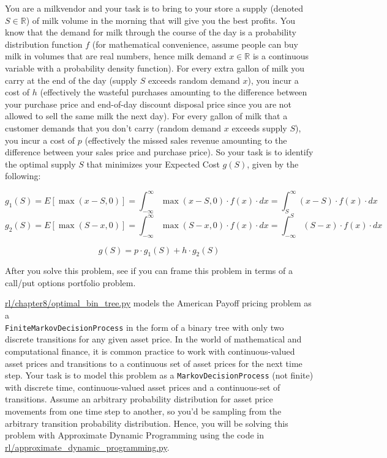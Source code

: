 \documentclass[12pt]{exam}
\begin{document}
\begin{questions}
\question You are a milkvendor and your task is to bring to your store a supply (denoted $S \in \mathbb{R}$) of milk volume in the morning that will give you the best profits. You know that the demand for milk through the course of the day is a probability distribution function $f$ (for mathematical convenience, assume people can buy milk in volumes that are real numbers, hence milk demand $x \in \mathbb{R}$ is a continuous variable with a probability density function). For every extra gallon of milk you carry at the end of the day (supply $S$ exceeds random demand $x$), you incur a cost of $h$ (effectively the wasteful purchases amounting to the difference between your purchase price and end-of-day discount disposal price since you are not allowed to sell the same milk the next day). For every gallon of milk that a customer demands that you don't carry (random demand $x$ exceeds supply $S$), you incur a cost of $p$ (effectively the missed sales revenue amounting to the difference between your sales price and purchase price). So your task is to identify the optimal supply $S$ that minimizes your Expected Cost $g(S)$, given by the following:

$$g_1(S) = E[\max(x-S, 0)] = \int_{-\infty}^{\infty} \max(x-S, 0) \cdot f(x) \cdot dx = \int_S^{\infty} (x-S) \cdot f(x) \cdot dx$$
$$g_2(S) = E[\max(S-x, 0)] = \int_{-\infty}^{\infty} \max(S-x, 0) \cdot f(x) \cdot dx = \int_{-\infty}^S (S-x) \cdot f(x) \cdot dx$$

$$g(S) = p \cdot g_1(S) + h \cdot g_2(S)$$

After you solve this problem, see if you can frame this problem in terms of a call/put options portfolio problem.

\question \href{https://github.com/TikhonJelvis/RL-book/blob/master/rl/chapter8/optimal_exercise_bin_tree.py}{rl\//chapter8\//optimal\_bin\_tree.py} models the American Payoff pricing problem as a \\ \lstinline{FiniteMarkovDecisionProcess} in the form of a binary tree with only two discrete transitions for any given asset price. In the world of mathematical and computational finance, it is common practice to work with continuous-valued asset prices and transitions to a continuous set of asset prices for the next time step. Your task is to model this problem as a \lstinline{MarkovDecisionProcess} (not finite) with discrete time, continuous-valued asset prices and a continuous-set of transitions. Assume an arbitrary probability distribution for asset price movements from one time step to another, so you'd be sampling from the arbitrary transition probability distribution. Hence, you will be solving this problem with Approximate Dynamic Programming using the code in \href{https://github.com/TikhonJelvis/RL-book/blob/master/rl/approximate_dynamic_programming.py}{rl\//approximate\_dynamic\_programming.py}.


\end{questions}
\end{document}
